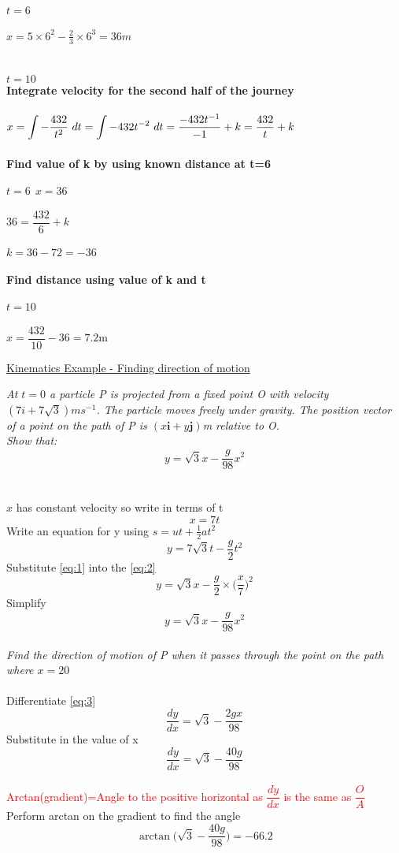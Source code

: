 \documentclass{article}[18pt]
\begin{document}
\\
$t=6$\\
\\
$x=5\times6^2-\frac{2}{3}\times6^3=36m$\\
\\
\\
$\mathit{t = 10}$
\\
\textbf{Integrate velocity for the second half of the journey}\\
\\
$x=\mathlarger{\int-\dfrac{432}{t^2} \ dt=\int-432t^{-2} \ dt=\dfrac{-432t^{-1}}{-1}+k=\dfrac{432}{t}+k}$\\
\\
\textbf{Find value of k by using known distance at t=6}\\
\\
$t=6 \ \ x=36$\\
\\
$36=\dfrac{432}{6}+k$\\
\\
$k=36-72=-36$\\
\\
\textbf{Find distance using value of k and t}\\
\\
$t=10$\\
\\
$x=\dfrac{432}{10}-36=7.2\text{m}$
\newpage
\begin{center}
\underline{\huge Kinematics Example - Finding direction of motion}
\end{center}
\textit{At $t=0$ a particle P is projected from a fixed point O with velocity $(7i+7\sqrt{3})ms^{-1}$. The particle moves freely under gravity. The position vector of a point on the path of P is $(x\mathbf{i}+y\mathbf{j})$m relative to O.}\\
\textit{Show that:}
$$y=\sqrt{3}x-\frac{g}{98}x^2$$
\\
\\
$x$ has constant velocity so write in terms of t
\begin{equation}\label{eq:1}
x=7t
\end{equation}
Write an equation for y using $s=ut+\frac{1}{2}at^2$
\begin{equation}\label{eq:2}
y=7\sqrt{3}t-\frac{g}{2}t^2
\end{equation}
Substitute \eqref{eq:1} into the \eqref{eq:2}
$$y=\sqrt{3}x-\frac{g}{2}\times\Big(\frac{x}{7}\Big)^2$$
Simplify
\begin{equation}\label{eq:3}
y=\sqrt{3}x-\frac{g}{98}x^2
\end{equation}
\\
\textit{Find the direction of motion of P when it passes through the point on the path where $x=20$}\\
\\
Differentiate \eqref{eq:3}
$$\frac{dy}{dx}=\sqrt{3}-\frac{2gx}{98}$$
Substitute in the value of x
$$\frac{dy}{dx}=\sqrt{3}-\frac{40g}{98}$$
\\
\textcolor{red}{Arctan(gradient)=Angle to the positive horizontal as $\dfrac{dy}{dx}$ is the same as $\dfrac{O}{A}$
}
\\
Perform arctan on the gradient to find the angle
$$\arctan\Big(\sqrt{3}-\frac{40g}{98}\Big)=-66.2$$
\end{document}
